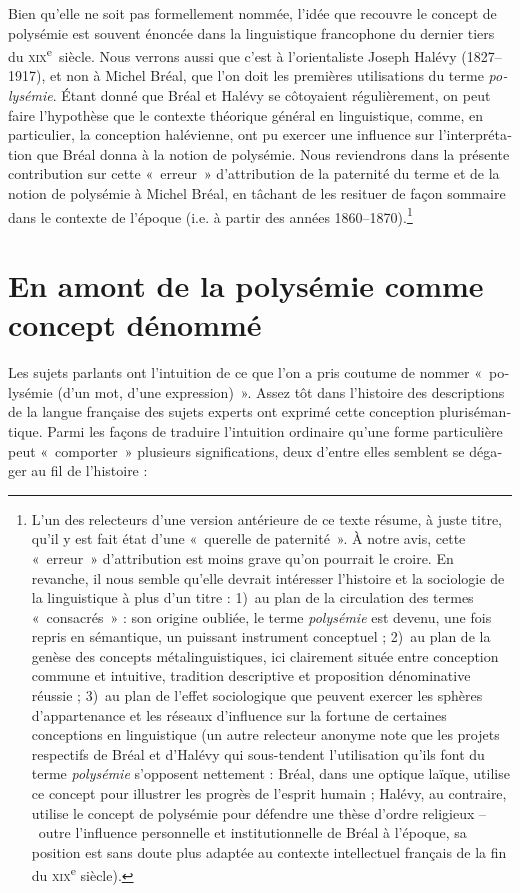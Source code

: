 \documentclass[output=paper]{langsci/langscibook}
\begin{document}
\begin{otherlanguage}{french}
Bien qu’elle ne soit pas formellement nommée, l’idée que recouvre le concept de polysémie est souvent énoncée dans la linguistique francophone du dernier tiers du \textsc{xix}\textsuperscript{e}~siècle. Nous verrons aussi que c’est à l’orientaliste Joseph Halévy (1827--1917), et non à Michel Bréal, que l’on doit les premières utilisations du terme \textit{polysémie}. Étant donné que Bréal et Halévy se côtoyaient régulièrement, on peut faire l’hypothèse que le contexte théorique général en linguistique, comme, en particulier, la conception halévienne, ont pu exercer une influence sur l’interprétation que Bréal donna à la notion de polysémie. Nous reviendrons dans la présente contribution sur cette «~erreur~» d’attribution de la paternité du terme et de la notion de polysémie à Michel Bréal, en tâchant de les resituer de façon sommaire dans le contexte de l’époque (i.e. à partir des années 1860--1870).\footnote{L’un des relecteurs d’une version antérieure de ce texte résume, à juste titre, qu’il y est fait état d’une «~querelle de paternité~». À notre avis, cette «~erreur~» d’attribution est moins grave qu’on pourrait le croire. En revanche, il nous semble qu’elle devrait intéresser l’histoire et la sociologie de la linguistique à plus d’un titre : 1)~au plan de la circulation des termes «~consacrés~» : son origine oubliée, le terme \textit{polysémie} est devenu, une fois repris en sémantique, un puissant instrument conceptuel ; 2)~au plan de la genèse des concepts métalinguistiques, ici clairement située entre conception commune et intuitive, tradition descriptive et proposition dénominative réussie ; 3)~au plan de l’effet sociologique que peuvent exercer les sphères d’appartenance et les réseaux d’influence sur la fortune de certaines conceptions en linguistique (un autre relecteur anonyme note que les projets respectifs de Bréal et d’Halévy qui sous-tendent l’utilisation qu’ils font du terme \textit{polysémie} s’opposent nettement : Bréal, dans une optique laïque, utilise ce concept pour illustrer les progrès de l’esprit humain ; Halévy, au contraire, utilise le concept de polysémie pour défendre une thèse d’ordre religieux –~outre l’influence personnelle et institutionnelle de Bréal à l’époque, sa position est sans doute plus adaptée au contexte intellectuel français de la fin du \textsc{xix}\textsuperscript{e} siècle).}
 
\section{En amont de la polysémie comme concept dénommé}
Les sujets parlants ont l’intuition de ce que l’on a pris coutume de nommer «~polysémie (d’un mot, d’une expression)~». Assez tôt dans l’histoire des descriptions de la langue française des sujets experts ont exprimé cette conception plurisémantique. Parmi les façons de traduire l’intuition ordinaire qu’une forme particulière peut «~comporter~» plusieurs significations, deux d’entre elles semblent se dégager au fil de l’histoire :


\end{otherlanguage}
\end{document}
